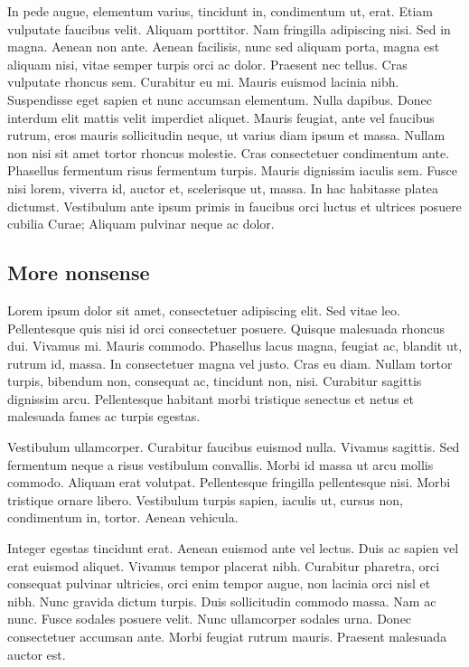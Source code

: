 In pede augue, elementum varius, tincidunt in, condimentum ut, erat.
Etiam vulputate faucibus velit. Aliquam porttitor. Nam fringilla
adipiscing nisi. Sed in magna. Aenean non ante. Aenean facilisis, nunc
sed aliquam porta, magna est aliquam nisi, vitae semper turpis orci ac
dolor. Praesent nec tellus. Cras vulputate rhoncus sem. Curabitur eu mi.
Mauris euismod lacinia nibh. Suspendisse eget sapien et nunc accumsan
elementum. Nulla dapibus. Donec interdum elit mattis velit imperdiet
aliquet. Mauris feugiat, ante vel faucibus rutrum, eros mauris
sollicitudin neque, ut varius diam ipsum et massa. Nullam non nisi sit
amet tortor rhoncus molestie. Cras consectetuer condimentum ante.
Phasellus fermentum risus fermentum turpis. Mauris dignissim iaculis
sem. Fusce nisi lorem, viverra id, auctor et, scelerisque ut, massa. In
hac habitasse platea dictumst. Vestibulum ante ipsum primis in faucibus
orci luctus et ultrices posuere cubilia Curae; Aliquam pulvinar neque ac
dolor.

\subsection{More nonsense}\label{more-nonsense}

Lorem ipsum dolor sit amet, consectetuer adipiscing elit. Sed vitae leo.
Pellentesque quis nisi id orci consectetuer posuere. Quisque malesuada
rhoncus dui. Vivamus mi. Mauris commodo. Phasellus lacus magna, feugiat
ac, blandit ut, rutrum id, massa. In consectetuer magna vel justo. Cras
eu diam. Nullam tortor turpis, bibendum non, consequat ac, tincidunt
non, nisi. Curabitur sagittis dignissim arcu. Pellentesque habitant
morbi tristique senectus et netus et malesuada fames ac turpis egestas.

Vestibulum ullamcorper. Curabitur faucibus euismod nulla. Vivamus
sagittis. Sed fermentum neque a risus vestibulum convallis. Morbi id
massa ut arcu mollis commodo. Aliquam erat volutpat. Pellentesque
fringilla pellentesque nisi. Morbi tristique ornare libero. Vestibulum
turpis sapien, iaculis ut, cursus non, condimentum in, tortor. Aenean
vehicula.

Integer egestas tincidunt erat. Aenean euismod ante vel lectus. Duis ac
sapien vel erat euismod aliquet. Vivamus tempor placerat nibh. Curabitur
pharetra, orci consequat pulvinar ultricies, orci enim tempor augue, non
lacinia orci nisl et nibh. Nunc gravida dictum turpis. Duis sollicitudin
commodo massa. Nam ac nunc. Fusce sodales posuere velit. Nunc
ullamcorper sodales urna. Donec consectetuer accumsan ante. Morbi
feugiat rutrum mauris. Praesent malesuada auctor est.

